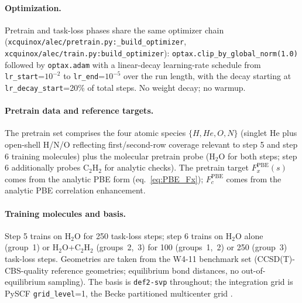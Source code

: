 \documentclass[11pt,letterpaper]{article}
\begin{document}
\paragraph{Optimization.} Pretrain and task-loss phases share the same
optimizer chain (\texttt{xcquinox/alec/pretrain.py:\_build\_optimizer},
\texttt{xcquinox/alec/train.py:build\_optimizer}):
\texttt{optax.clip\_by\_global\_norm(1.0)} followed by
\texttt{optax.adam} with a linear-decay learning-rate schedule from
\texttt{lr\_start}=$10^{-2}$ to \texttt{lr\_end}=$10^{-5}$ over the run
length, with the decay starting at \texttt{lr\_decay\_start}=20\% of
total steps. No weight decay; no warmup.

\paragraph{Pretrain data and reference targets.} The pretrain set comprises
the four atomic species $\{H, He, O, N\}$ (singlet He plus open-shell
H/N/O reflecting first/second-row coverage relevant to step 5 and step 6
training molecules) plus the molecular pretrain probe (H$_2$O for both
steps; step 6 additionally probes C$_2$H$_2$ for analytic checks). The
pretrain target $F_x^{\mathrm{PBE}}(s)$ comes from the analytic PBE form
(eq.~\ref{eq:PBE_Fx}); $F_c^{\mathrm{PBE}}$ comes from the analytic
PBE correlation enhancement.

\paragraph{Training molecules and basis.} Step 5 trains on H$_2$O for 250
task-loss steps; step 6 trains on H$_2$O alone (group~1) or
H$_2$O+C$_2$H$_2$ (groups~2,~3) for 100 (groups~1,~2)
or 250 (group~3) task-loss steps. Geometries are taken from the W4-11
benchmark set (CCSD(T)-CBS-quality reference geometries; equilibrium
bond distances, no out-of-equilibrium sampling). The basis is
\texttt{def2-svp} throughout; the integration grid is PySCF
\texttt{grid\_level}=1, the Becke partitioned multicenter grid
\citep{Becke1988}.
\end{document}
